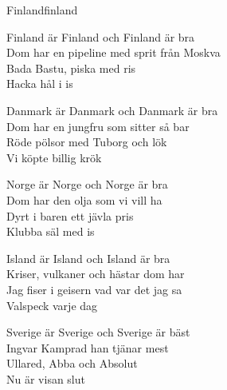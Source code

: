 \begin{song}{Finland}{finland}
\begin{vers}
Finland är Finland och Finland är bra\\
Dom har en pipeline med sprit från Moskva\\
Bada Bastu, piska med ris\\
Hacka hål i is\\
\end{vers}
\begin{vers}
Danmark är Danmark och Danmark är bra\\
Dom har en jungfru som sitter så bar\\
Röde pölsor med Tuborg och lök\\
Vi köpte billig krök\\
\end{vers}
\begin{vers}
Norge är Norge och Norge är bra\\
Dom har den olja som vi vill ha\\
Dyrt i baren ett jävla pris\\
Klubba säl med is\\
\end{vers}
\begin{vers}
Island är Island och Island är bra\\
Kriser, vulkaner och hästar dom har\\
Jag fiser i geisern vad var det jag sa\\
Valspeck varje dag\\
\end{vers}
\begin{vers}
Sverige är Sverige och Sverige är bäst\\
Ingvar Kamprad han tjänar mest\\
Ullared, Abba och Absolut\\
Nu är visan slut\\
\end{vers}
\end{song}

